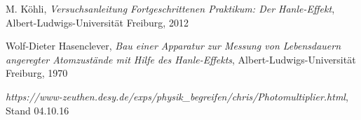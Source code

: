 \documentclass[12pt]{article}
\begin{document}
\newpage
\thispagestyle{empty}
\begin{thebibliography}{9}

  

  
  

M. Köhli,
\emph{Versuchsanleitung Fortgeschrittenen Praktikum: Der Hanle-Effekt},
Albert-Ludwigs-Universität Freiburg,
2012

Wolf-Dieter Hasenclever,
\emph{Bau einer Apparatur zur Messung von Lebensdauern angeregter Atomzustände mit Hilfe des Hanle-Effekts},
Albert-Ludwigs-Universität Freiburg,
1970

\emph{https://www-zeuthen.desy.de/exps/physik\_begreifen/chris/Photomultiplier.html}, Stand 04.10.16
\end{thebibliography}
\end{document}
